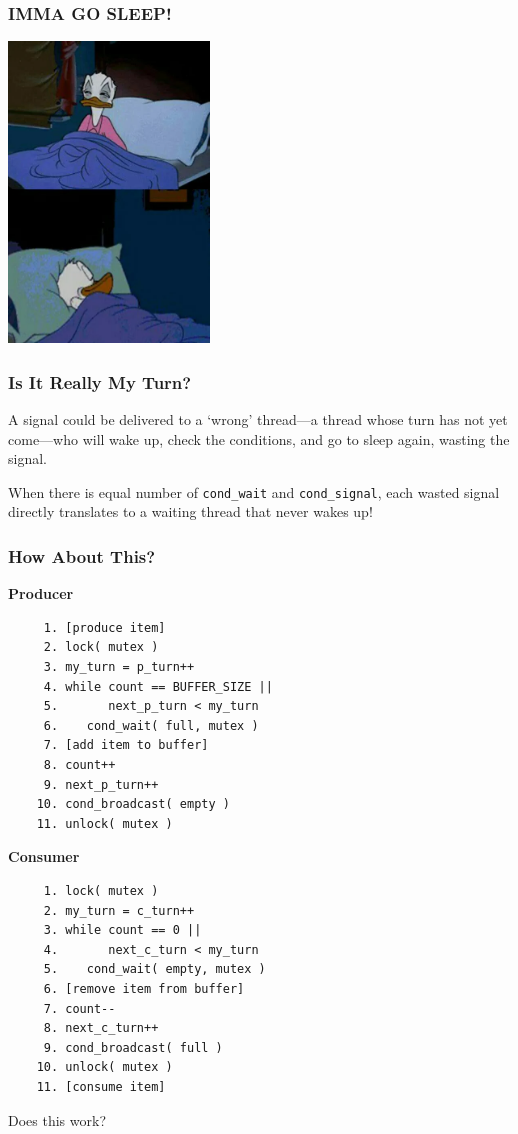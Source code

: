 \begin{frame}
	\frametitle{IMMA GO SLEEP!}

	\begin{center}
		\includegraphics[width=0.4\textwidth]{images/sleepagain}
	\end{center}
\end{frame}

\begin{frame}
	\frametitle{Is It Really My Turn?}
	A signal could be delivered to a `wrong' thread—a thread whose turn has not yet come—who will wake up, check the conditions, and go to sleep again, wasting the signal.

	When there is equal number of \texttt{cond\_wait} and \texttt{cond\_signal}, each wasted signal directly translates to a waiting thread that never wakes up!
\end{frame}

\begin{frame}[fragile]
	\frametitle{How About This?}

	\begin{multicols}{2}
		\small
		\textbf{Producer}
		\begin{verbatim}
	 1. [produce item]
	 2. lock( mutex )
	 3. my_turn = p_turn++
	 4. while count == BUFFER_SIZE ||
	 5.       next_p_turn < my_turn
	 6.    cond_wait( full, mutex )
	 7. [add item to buffer]
	 8. count++
	 9. next_p_turn++
	10. cond_broadcast( empty )
	11. unlock( mutex )
		\end{verbatim}
		\columnbreak
		\textbf{Consumer}\vspace{-2em}
		\begin{verbatim}
	 1. lock( mutex )
	 2. my_turn = c_turn++
	 3. while count == 0 ||
	 4.       next_c_turn < my_turn
	 5.    cond_wait( empty, mutex )
	 6. [remove item from buffer]
	 7. count--
	 8. next_c_turn++
	 9. cond_broadcast( full )
	10. unlock( mutex )
	11. [consume item]
		\end{verbatim}
	\end{multicols}
	\vspace{-2em}

	Does this work?

\end{frame}

